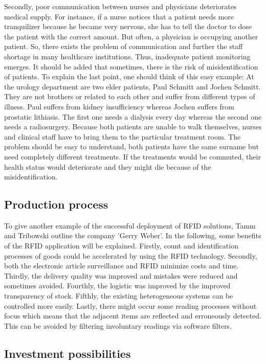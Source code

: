 Secondly, poor communication between nurses and physicians deteriorates medical supply. For instance, if a nurse notices that a patient needs more tranquilizer because he became very nervous, she has to tell the doctor to dose the patient with the correct amount. But often, a physician is occupying another patient. So, there exists the problem of communication and further the staff shortage in many healthcare institutions. Thus, inadequate patient monitoring emerges. It should be added that sometimes, there is the risk of misidentification of patients.
To explain the last point, one should think of this easy example: At the urology department are two elder patients, Paul Schmitt and Jochen Schmitt. They are not brothers or related to each other and suffer from different types of illness. Paul suffers from kidney insufficiency whereas Jochen suffers from prostatic lithiasis. The first one needs a dialysis every day whereas the second one needs a radiosurgery. Because both patients are unable to walk themselves, nurses and clinical staff have to bring them to the particular treatment room. The problem should be easy to understand, both patients have the same surname but need completely different treatments. If the treatments would be commuted, their health status would deteriorate and they might die because of the misidentification.

\subsection{Production process}

To give another example of the successful deployment of  RFID solutions, Tamm and Tribowski \cite[p.110 ff.]{fokus} outline the company 'Gerry Weber'. In the following, some benefits of the RFID application will be explained. Firstly, count and identification processes of goods could be accelerated by using the RFID technology. Secondly, both the electronic article surveillance and RFID minimize costs and time. Thirdly, the delivery quality was improved and mistakes were reduced and sometimes avoided. Fourthly, the logistic was improved by the improved transparency of stock. Fifthly, the existing heterogeneous systems can be controlled more easily. Lastly, there might occur some reading processes without focus which means that the adjacent items are reflected and erroneously detected. This can be avoided by filtering involuntary readings via software filters.  

\subsection{Investment possibilities}


